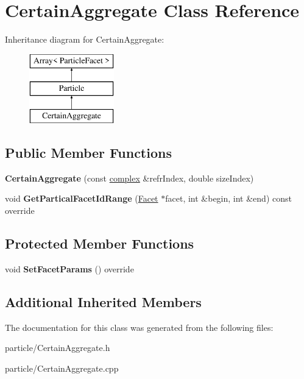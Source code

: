 \hypertarget{class_certain_aggregate}{}\section{Certain\+Aggregate Class Reference}
\label{class_certain_aggregate}
Inheritance diagram for Certain\+Aggregate\+:\begin{figure}[H]
\begin{center}
\leavevmode
\includegraphics[height=3.000000cm]{class_certain_aggregate}
\end{center}
\end{figure}
\subsection*{Public Member Functions}
\begin{DoxyCompactItemize}
\item 
\mbox{\label{class_certain_aggregate_a8f2bd1d6a7c1f20e937ff8f0e42dc7c7}} 
{\bfseries Certain\+Aggregate} (const \mbox{\hyperlink{classcomplex}{complex}} \&refr\+Index, double size\+Index)
\item 
\mbox{\label{class_certain_aggregate_a9278fd4dd43852adc4e400fa4be6316e}} 
void {\bfseries Get\+Partical\+Facet\+Id\+Range} (\mbox{\hyperlink{class_facet}{Facet}} $\ast$facet, int \&begin, int \&end) const override
\end{DoxyCompactItemize}
\subsection*{Protected Member Functions}
\begin{DoxyCompactItemize}
\item 
\mbox{\label{class_certain_aggregate_aa67b3812d8a84ad79bbcef90ac6bbe00}} 
void {\bfseries Set\+Facet\+Params} () override
\end{DoxyCompactItemize}
\subsection*{Additional Inherited Members}


The documentation for this class was generated from the following files\+:\begin{DoxyCompactItemize}
\item 
particle/Certain\+Aggregate.\+h\item 
particle/Certain\+Aggregate.\+cpp\end{DoxyCompactItemize}
